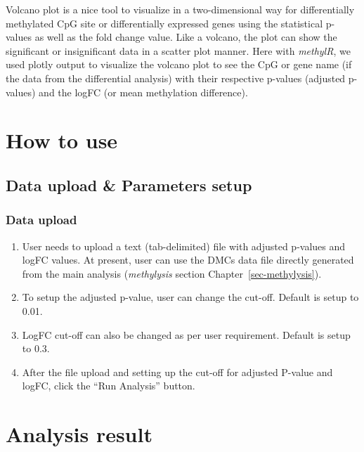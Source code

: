 \documentclass[
  a4paper,
  oneside,
  open=any]{scrreport}
\providecommand{\tightlist}{%
  \setlength{\itemsep}{0pt}\setlength{\parskip}{0pt}}\usepackage{longtable,booktabs,array}
\begin{document}
Volcano plot is a nice tool to visualize in a two-dimensional way for
differentially methylated CpG site or differentially expressed genes
using the statistical p-values as well as the fold change value. Like a
volcano, the plot can show the significant or insignificant data in a
scatter plot manner. Here with \emph{methylR}, we used plotly output to
visualize the volcano plot to see the CpG or gene name (if the data from
the differential analysis) with their respective p-values (adjusted
p-values) and the logFC (or mean methylation difference).

\hypertarget{how-to-use-5}{%
\section{How to use}\label{how-to-use-5}}

\hypertarget{data-upload-parameters-setup-2}{%
\subsection{Data upload \& Parameters
setup}\label{data-upload-parameters-setup-2}}

\hypertarget{data-upload-2}{%
\subsubsection{Data upload}\label{data-upload-2}}

\begin{enumerate}
\def\labelenumi{\arabic{enumi}.}
\tightlist
\item
  User needs to upload a text (tab-delimited) file with adjusted
  p-values and logFC values. At present, user can use the DMCs data file
  directly generated from the main analysis (\emph{methylysis} section
  Chapter~\ref{sec-methylysis}).
\item
  To setup the adjusted p-value, user can change the cut-off. Default is
  setup to 0.01.
\item
  LogFC cut-off can also be changed as per user requirement. Default is
  setup to 0.3.
\item
  After the file upload and setting up the cut-off for adjusted P-value
  and logFC, click the ``Run Analysis'' button.
\end{enumerate}

\hypertarget{analysis-result-2}{%
\section{Analysis result}\label{analysis-result-2}}
\end{document}
